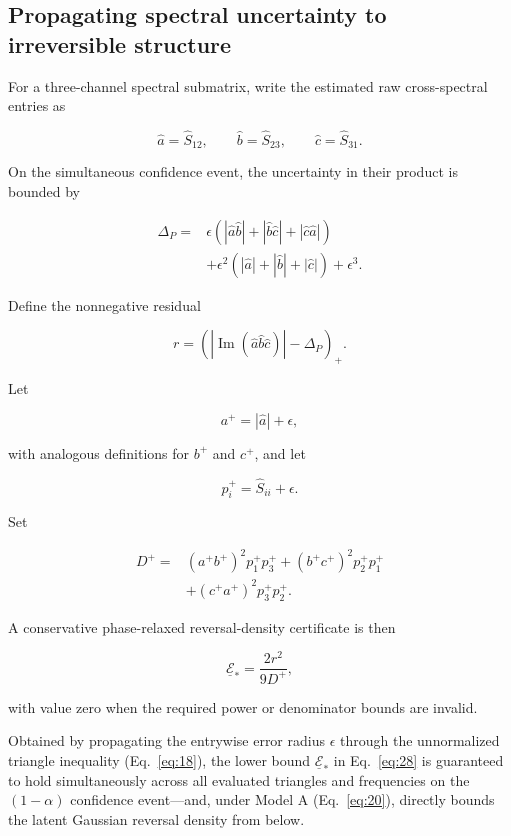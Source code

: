 \documentclass[aps,pre,reprint,amsmath,amssymb,superscriptaddress]{revtex4-2}
\begin{document}
\subsection{Propagating spectral uncertainty to irreversible structure}

For a three-channel spectral submatrix, write the estimated raw cross-spectral entries as

\[
\widehat a=\widehat S_{12},\qquad
\widehat b=\widehat S_{23},\qquad
\widehat c=\widehat S_{31}.
\]

On the simultaneous confidence event, the uncertainty in their product is bounded by

\begin{equation}\label{eq:27}
\begin{aligned}
\Delta_P={}&
\epsilon
\left(
|\widehat a\widehat b|
+
|\widehat b\widehat c|
+
|\widehat c\widehat a|
\right)\\
&+
\epsilon^2
\left(
|\widehat a|+
|\widehat b|+
|\widehat c|
\right)
+
\epsilon^3.
\end{aligned}
\end{equation}

Define the nonnegative residual

\[
r=
\left(
|\operatorname{Im}(\widehat a\widehat b\widehat c)|
-\Delta_P
\right)_+.
\]

Let

\[
a^+=|\widehat a|+\epsilon,
\]

with analogous definitions for \(b^+\) and \(c^+\), and let

\[
p_i^+=\widehat S_{ii}+\epsilon.
\]

Set

\[
\begin{aligned}
D^+={}&
(a^+b^+)^2p_1^+p_3^+
+
(b^+c^+)^2p_2^+p_1^+\\
&+
(c^+a^+)^2p_3^+p_2^+.
\end{aligned}
\]

A conservative phase-relaxed reversal-density certificate is then

\begin{equation}\label{eq:28}
\boxed{
\underline{\mathcal E}_*
=
\frac{2r^2}{9D^+},
}
\end{equation}

with value zero when the required power or denominator bounds are invalid.

Obtained by propagating the entrywise error radius $\epsilon$ through the unnormalized triangle inequality (Eq.~\eqref{eq:18}), the lower bound $\underline{\mathcal{E}}_*$ in Eq.~\eqref{eq:28} is guaranteed to hold simultaneously across all evaluated triangles and frequencies on the $(1-\alpha)$ confidence event---and, under Model A (Eq.~\eqref{eq:20}), directly bounds the latent Gaussian reversal density from below.
\end{document}
